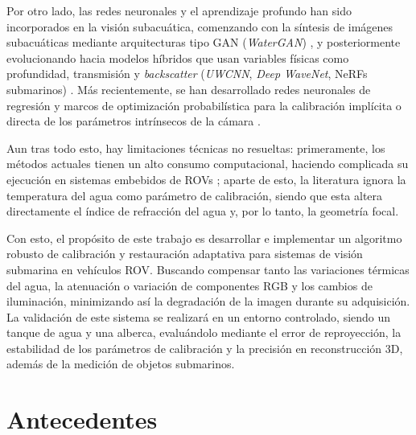 \documentclass[12pt,letterpaper,spanish,twoside,openright]{report}
\begin{document}
Por otro lado, las redes neuronales y el aprendizaje profundo han sido incorporados en la visión subacuática, comenzando con la síntesis de imágenes subacuáticas mediante arquitecturas tipo GAN (\textit{WaterGAN}) \parencite{7995024}, y posteriormente evolucionando hacia modelos híbridos que usan variables físicas como profundidad, transmisión y \textit{backscatter} (\textit{UWCNN}, \textit{Deep WaveNet}, NeRFs submarinos) \parencite{LI2020107038, 10.1145/3511021, 10225666}. Más recientemente, se han desarrollado redes neuronales de regresión y marcos de optimización probabilística para la calibración implícita o directa de los parámetros intrínsecos de la cámara \parencite{10772075, Meng:24, Zhou2025Probabilistic}.

Aun tras todo esto, hay limitaciones técnicas no resueltas: primeramente, los métodos actuales tienen un alto consumo computacional, haciendo complicada su ejecución en sistemas embebidos de ROVs \parencite{ZHANG2025108826}; aparte de esto, la literatura ignora la temperatura del agua como parámetro de calibración, siendo que esta altera directamente el índice de refracción del agua y, por lo tanto, la geometría focal.

Con esto, el propósito de este trabajo es desarrollar e implementar un algoritmo robusto de calibración y restauración adaptativa para sistemas de visión submarina en vehículos ROV. Buscando compensar tanto las variaciones térmicas del agua, la atenuación o variación de componentes RGB y los cambios de iluminación, minimizando así la degradación de la imagen durante su adquisición. La validación de este sistema se realizará en un entorno controlado, siendo un tanque de agua y una alberca, evaluándolo mediante el error de reproyección, la estabilidad de los parámetros de calibración y la precisión en reconstrucción 3D, además de la medición de objetos submarinos.


\section{Antecedentes}

\end{document}

